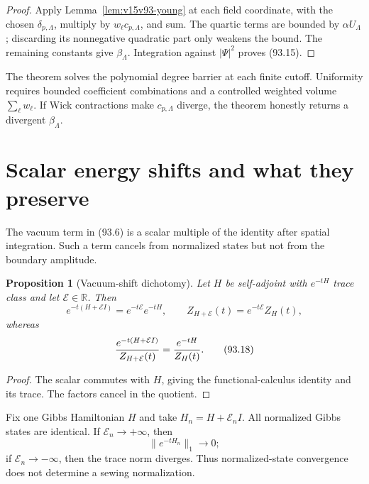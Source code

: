 \documentclass[11pt]{article}
\newtheorem{proposition}[theorem]{Proposition}
\theoremstyle{remark}
\begin{document}
\begin{proof}
Apply Lemma~\ref{lem:v15v93-young} at each field coordinate, with
the chosen \(\delta_{p,\Lambda}\), multiply by
\(w_\ell c_{p,\Lambda}\), and sum.  The quartic terms are bounded
by \(\alpha U_\Lambda\); discarding its nonnegative quadratic part
only weakens the bound.  The remaining constants give
\(\beta_\Lambda\).  Integration against \(|\Psi|^2\) proves
(93.15).
\end{proof}

The theorem solves the polynomial degree barrier at each finite
cutoff.  Uniformity requires bounded coefficient combinations and
a controlled weighted volume \(\sum_\ell w_\ell\).  If Wick
contractions make \(c_{p,\Lambda}\) diverge, the theorem honestly
returns a divergent \(\beta_\Lambda\).

\section{Scalar energy shifts and what they preserve}

The vacuum term in (93.6) is a scalar multiple of the identity after
spatial integration.  Such a term cancels from normalized states
but not from the boundary amplitude.

\begin{proposition}[Vacuum-shift dichotomy]
\label{prop:v15v93-vacuum-shift}
Let \(H\) be self-adjoint with \(e^{-tH}\) trace class and let
\(\mathcal E\in\mathbb R\).  Then
\[
 e^{-t(H+\mathcal EI)}
 =e^{-t\mathcal E}e^{-tH},\qquad
 Z_{H+\mathcal E}(t)=e^{-t\mathcal E}Z_H(t),           \tag{93.17}
\]
whereas
\[
 {e^{-t(H+\mathcal EI)}\over Z_{H+\mathcal E}(t)}
 ={e^{-tH}\over Z_H(t)}.                              \tag{93.18}
\]
\end{proposition}

\begin{proof}
The scalar commutes with \(H\), giving the functional-calculus
identity and its trace.  The factors cancel in the quotient.
\end{proof}

\begin{counterexample}
\label{cnt:v15v93-shift}
Fix one Gibbs Hamiltonian \(H\) and take
\(H_n=H+\mathcal E_nI\).  All normalized Gibbs states are identical.
If \(\mathcal E_n\to+\infty\), then
\[
 \|e^{-tH_n}\|_1\to0;
\]
if \(\mathcal E_n\to-\infty\), then the trace norm diverges.  Thus
normalized-state convergence does not determine a sewing
normalization.
\end{counterexample}
\end{document}
